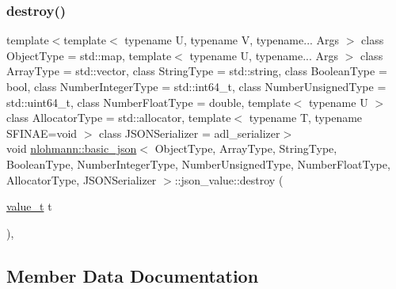 \subsubsection{\texorpdfstring{destroy()}{destroy()}}
{\footnotesize\ttfamily template$<$template$<$ typename U, typename V, typename... Args $>$ class Object\+Type = std\+::map, template$<$ typename U, typename... Args $>$ class Array\+Type = std\+::vector, class String\+Type  = std\+::string, class Boolean\+Type  = bool, class Number\+Integer\+Type  = std\+::int64\+\_\+t, class Number\+Unsigned\+Type  = std\+::uint64\+\_\+t, class Number\+Float\+Type  = double, template$<$ typename U $>$ class Allocator\+Type = std\+::allocator, template$<$ typename T, typename S\+F\+I\+N\+A\+E=void $>$ class J\+S\+O\+N\+Serializer = adl\+\_\+serializer$>$ \\
void \hyperlink{classnlohmann_1_1basic__json}{nlohmann\+::basic\+\_\+json}$<$ Object\+Type, Array\+Type, String\+Type, Boolean\+Type, Number\+Integer\+Type, Number\+Unsigned\+Type, Number\+Float\+Type, Allocator\+Type, J\+S\+O\+N\+Serializer $>$\+::json\+\_\+value\+::destroy (\begin{DoxyParamCaption}\item[{\hyperlink{namespacenlohmann_1_1detail_a1ed8fc6239da25abcaf681d30ace4985}{value\+\_\+t}}]{t }\end{DoxyParamCaption})\hspace{0.3cm}{\ttfamily [inline]}, {\ttfamily [noexcept]}}



\subsection{Member Data Documentation}
\mbox{\label{unionnlohmann_1_1basic__json_1_1json__value_a7947687f3ae1911d6e9847e2b3226157}} 

